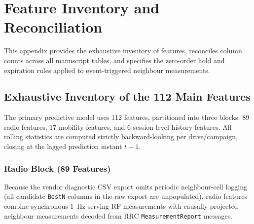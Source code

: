\chapter{Feature Inventory and Reconciliation}\label{app:B}
\renewcommand{\_}{\textunderscore\allowbreak}

This appendix provides the exhaustive inventory of features, reconciles column counts across all manuscript tables, and specifies the zero-order hold and expiration rules applied to event-triggered neighbour measurements.

\section{Exhaustive Inventory of the 112 Main Features}

The primary predictive model uses 112 features, partitioned into three blocks: 89 radio features, 17 mobility features, and 6 session-level history features. All rolling statistics are computed strictly backward-looking per drive/campaign, closing at the lagged prediction instant $t-1$.

\subsection{Radio Block (89 Features)}
Because the vendor diagnostic CSV export omits periodic neighbour-cell logging (all candidate \texttt{Best\_N} columns in the raw export are unpopulated), radio features combine synchronous 1~Hz serving RF measurements with causally projected neighbour measurements decoded from RRC \texttt{MeasurementReport} messages.

